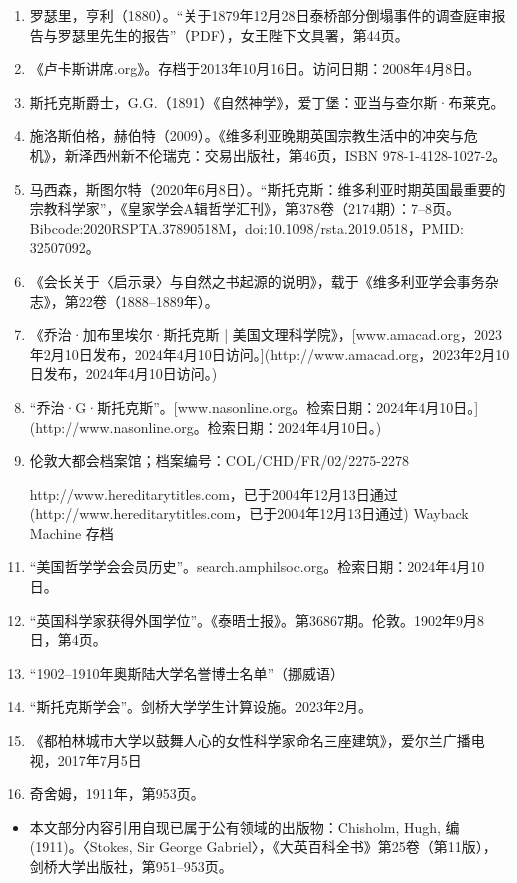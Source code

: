 \begin{enumerate}
\item 罗瑟里，亨利（1880）。“关于1879年12月28日泰桥部分倒塌事件的调查庭审报告与罗瑟里先生的报告”（PDF），女王陛下文具署，第44页。
\item 《卢卡斯讲席.org》。存档于2013年10月16日。访问日期：2008年4月8日。
\item 斯托克斯爵士，G.G.（1891）《自然神学》，爱丁堡：亚当与查尔斯·布莱克。
\item 施洛斯伯格，赫伯特（2009）。《维多利亚晚期英国宗教生活中的冲突与危机》，新泽西州新不伦瑞克：交易出版社，第46页，ISBN 978-1-4128-1027-2。
\item 马西森，斯图尔特（2020年6月8日）。“斯托克斯：维多利亚时期英国最重要的宗教科学家”，《皇家学会A辑哲学汇刊》，第378卷（2174期）：7–8页。Bibcode:2020RSPTA.37890518M，doi:10.1098/rsta.2019.0518，PMID: 32507092。
\item 《会长关于〈启示录〉与自然之书起源的说明》，载于《维多利亚学会事务杂志》，第22卷（1888–1889年）。
\item 《乔治·加布里埃尔·斯托克斯 | 美国文理科学院》，[www.amacad.org，2023年2月10日发布，2024年4月10日访问。](http://www.amacad.org，2023年2月10日发布，2024年4月10日访问。)
\item  “乔治·G·斯托克斯”。[www.nasonline.org。检索日期：2024年4月10日。](http://www.nasonline.org。检索日期：2024年4月10日。)
\item 伦敦大都会档案馆；档案编号：COL/CHD/FR/02/2275-2278
\item [http://www.hereditarytitles.com，已于2004年12月13日通过](http://www.hereditarytitles.com，已于2004年12月13日通过) Wayback Machine 存档
\item “美国哲学学会会员历史”。search.amphilsoc.org。检索日期：2024年4月10日。
\item “英国科学家获得外国学位”。《泰晤士报》。第36867期。伦敦。1902年9月8日，第4页。
\item “1902–1910年奥斯陆大学名誉博士名单”（挪威语）
\item “斯托克斯学会”。剑桥大学学生计算设施。2023年2月。
\item 《都柏林城市大学以鼓舞人心的女性科学家命名三座建筑》，爱尔兰广播电视，2017年7月5日
\item 奇舍姆，1911年，第953页。
\end{enumerate}
\begin{itemize}
\item 本文部分内容引用自现已属于公有领域的出版物：Chisholm, Hugh, 编 (1911)。〈Stokes, Sir George Gabriel〉，《大英百科全书》第25卷（第11版），剑桥大学出版社，第951–953页。
\end{itemize}